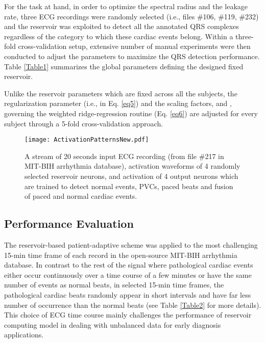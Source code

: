\documentclass[review]{elsarticle}
\begin{document}
For the task at hand, in order to optimize the spectral radius and the leakage rate, three ECG recordings were randomly selected (i.e., files \#106, \#119, \#232) and the reservoir was exploited to detect all the annotated QRS complexes regardless of the category to which these cardiac events belong. Within a three-fold cross-validation setup, extensive number of manual experiments were then conducted to adjust the parameters to maximize the QRS detection performance. Table \ref{Table1} summarizes the global parameters defining the designed fixed reservoir. 


\begin{table}[h]
\renewcommand{\arraystretch}{1.3}
\caption{Global parameters of the fixed reservoir.}
\label{Table1}
\begin{center}
\end{center}
\end{table}

Unlike the reservoir parameters which are fixed across all the subjects, the regularization parameter (i.e.,  in Eq. \ref{eq5}) and the scaling factors,  and , governing the weighted ridge-regression routine (Eq. \ref{eq6}) are adjusted for every subject through a 5-fold cross-validation approach. 

\begin{figure*}[h!]
\centering
\texttt{[image: ActivationPatternsNew.pdf]}
\caption{A stream of 20 seconds input ECG recording (from file \#217 in MIT-BIH arrhythmia database), activation waveforms of 4 randomly selected reservoir neurons, and activation of 4 output neurons which are trained to detect normal events, PVCs, paced beats and fusion of paced and normal cardiac events.}
\label{fig_activation}
\end{figure*}


\subsection{Performance Evaluation}
The reservoir-based patient-adaptive scheme was applied to the most challenging 15-min time frame of each record in the open-source MIT-BIH arrhythmia database. In contrast to the rest of the signal where pathological cardiac events either occur continuously over a time course of a few minutes or have the same number of events as normal beats, in selected 15-min time frames, the pathological cardiac beats randomly appear in short intervals and have far less number of occurrence than the normal beats (see Table \ref{Table2} for more details). This choice of ECG time course mainly challenges the performance of reservoir computing model in dealing with unbalanced data for early diagnosis applications.
\end{document}
